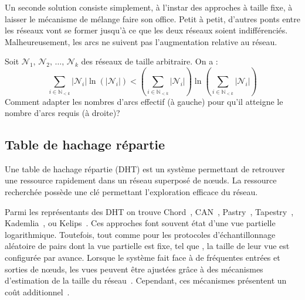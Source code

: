 Un seconde solution consiste simplement, à l'instar des approches à taille fixe,
à laisser le mécanisme de mélange faire son office. Petit à petit, d'autres
ponts entre les réseaux vont se former jusqu'à ce que les deux réseaux soient
indifférenciés. Malheureusement, les arcs ne suivent pas l'augmentation relative
au réseau.

\begin{problem}
  Soit $\mathcal{N}_1,\, \mathcal{N}_2,\, \ldots ,\, \mathcal{N}_k$ des réseaux
  de taille arbitraire. On a :
\begin{equation}
  \sum\limits_{i \in \mathbb{N}_{<k}} |\mathcal{N}_i|\ln (|\mathcal{N}_i|) < (\sum\limits_{i \in \mathbb{N}_{<k}} |\mathcal{N}_i|)\ln{(\sum\limits_{i \in \mathbb{N}_{<k}} |\mathcal{N}_i|)}
\end{equation}
Comment adapter les nombres d'arcs effectif (à gauche) pour qu'il atteigne le
nombre d'arcs requis (à droite)?
\end{problem}



\subsection{Table de hachage répartie}

Une table de hachage répartie (DHT) est un système permettant de retrouver une
ressource rapidement dans un réseau superposé de nœuds. La ressource recherchée
possède une clé permettant l'exploration efficace du réseau.

Parmi les représentants des DHT on trouve Chord~\cite{stoica2001chord},
CAN~\cite{ratnasamy2001scalable}, Pastry~\cite{rowstron2001pastry},
Tapestry~\cite{zhao2006tapestry}, Kademlia~\cite{maymounkov2002kademlia}, ou
Kelips~\cite{gupta2003kelips}.  Ces approches font souvent état d'une vue
partielle logarithmique.  Toutefois, tout comme pour les protocoles
d'échantillonnage aléatoire de pairs dont la vue partielle est fixe, tel que
\CYCLON, la taille de leur vue est configurée par avance. Lorsque le système
fait face à de fréquentes entrées et sorties de nœuds, les vues peuvent être
ajustées grâce à des mécanismes d'estimation de la taille du
réseau~\cite{camarillo2014self, ghinita2006adaptive}. Cependant, ces mécanismes
présentent un coût additionnel~\cite{ghinita2006adaptive}.

